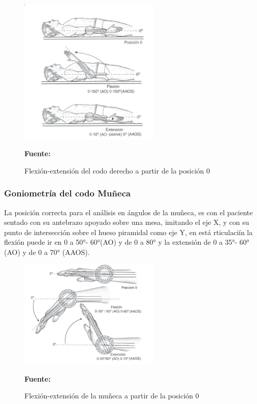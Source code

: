 
\begin{figure}[H]
    \centering
    \includegraphics[width=0.6\textwidth]{Anexos/LATEX/chapters/images/goniometria_codo.png}
    \caption{Flexión-extensión del codo derecho a partir de la posición 0}
    \small{\textbf{Fuente:} \parencite{Taboadela2007TaboadelaLaborales.} }
    \label{GONIOMETRIA_CODO}
\end{figure}

\subsubsection{Goniometría del codo Muñeca}
La posición correcta para el análisis en ángulos de la muñeca, es con el paciente sentado con su antebrazo apoyado sobre una mesa, imitando el eje X, y con su punto de intersección sobre el hueso piramidal como eje Y, en está rticulaciín la flexión puede ir en 0 a 50°- 60°(AO) y de 0 a 80° y la extensión de 0 a 35°- 60° (AO) y de 0 a 70° (AAOS).\parencite{Taboadela2007TaboadelaLaborales.}

\begin{figure}[H]
    \centering
    \includegraphics[width=0.6\textwidth]{Anexos/LATEX/chapters/images/goniometria_muneca.png}
    \caption{Flexión-extensión de la muñeca a partir de la posición 0}
    \small{\textbf{Fuente:} \parencite{Taboadela2007TaboadelaLaborales.} }
    \label{GONIOMETRIA_MUNECA}
\end{figure}


